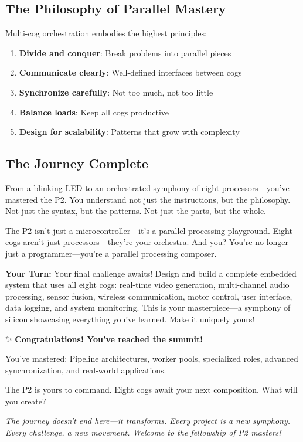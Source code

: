 \documentclass[11pt]{book}
\providecommand{\tightlist}{%
  \setlength{\itemsep}{0pt}\setlength{\parskip}{0pt}}
\begin{document}
\hypertarget{the-philosophy-of-parallel-mastery}{%
\subsection{The Philosophy of Parallel
Mastery}\label{the-philosophy-of-parallel-mastery}}

Multi-cog orchestration embodies the highest principles:

\begin{enumerate}
\def\labelenumi{\arabic{enumi}.}
\tightlist
\item
  \textbf{Divide and conquer}: Break problems into parallel pieces
\item
  \textbf{Communicate clearly}: Well-defined interfaces between cogs
\item
  \textbf{Synchronize carefully}: Not too much, not too little
\item
  \textbf{Balance loads}: Keep all cogs productive
\item
  \textbf{Design for scalability}: Patterns that grow with complexity
\end{enumerate}

\hypertarget{the-journey-complete}{%
\subsection{The Journey Complete}\label{the-journey-complete}}

From a blinking LED to an orchestrated symphony of eight
processors---you've mastered the P2. You understand not just the
instructions, but the philosophy. Not just the syntax, but the patterns.
Not just the parts, but the whole.

The P2 isn't just a microcontroller---it's a parallel processing
playground. Eight cogs aren't just processors---they're your orchestra.
And you? You're no longer just a programmer---you're a parallel
processing composer.

\textbf{Your Turn:} Your final challenge awaits! Design and build a
complete embedded system that uses all eight cogs: real-time video
generation, multi-channel audio processing, sensor fusion, wireless
communication, motor control, user interface, data logging, and system
monitoring. This is your masterpiece---a symphony of silicon showcasing
everything you've learned. Make it uniquely yours!

\begin{chapterend}
✨ \textbf{Congratulations! You've reached the summit!}

You've mastered: Pipeline architectures, worker pools, specialized roles, advanced synchronization, and real-world applications.

The P2 is yours to command. Eight cogs await your next composition. What will you create?

\textit{The journey doesn't end here—it transforms. Every project is a new symphony. Every challenge, a new movement. Welcome to the fellowship of P2 masters!}
\end{chapterend}
\end{document}
